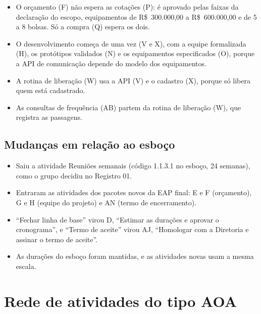 \documentclass[a4paper]{article}
\begin{document}
\begin{itemize}
    \item O orçamento (F) não espera as cotações (P): é aprovado pelas faixas da declaração do escopo, equipamentos de R\$~300.000,00 a R\$~600.000,00 e de 5 a 8 bolsas. Só a compra (Q) espera os dois.
    \item O desenvolvimento começa de uma vez (V e X), com a equipe formalizada (H), os protótipos validados (N) e os equipamentos especificados (O), porque a API de comunicação depende do modelo dos equipamentos.
    \item A rotina de liberação (W) usa a API (V) e o cadastro (X), porque só libera quem está cadastrado.
    \item As consultas de frequência (AB) partem da rotina de liberação (W), que registra as passagens.
\end{itemize}

\subsection{Mudanças em relação ao esboço}

\begin{itemize}
    \item Saiu a atividade Reuniões semanais (código 1.1.3.1 no esboço, 24 semanas), como o grupo decidiu no Registro 01.
    \item Entraram as atividades dos pacotes novos da EAP final: E e F (orçamento), G e H (equipe do projeto) e AN (termo de encerramento).
    \item \enquote{Fechar linha de base} virou D, \enquote{Estimar as durações e aprovar o cronograma}, e \enquote{Termo de aceite} virou AJ, \enquote{Homologar com a Diretoria e assinar o termo de aceite}.
    \item As durações do esboço foram mantidas, e as atividades novas usam a mesma escala.
\end{itemize}

\section{Rede de atividades do tipo AOA}

\end{document}
